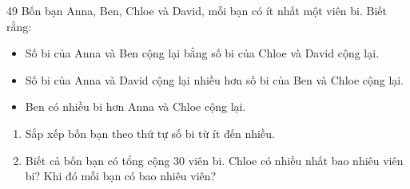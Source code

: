\begin{probbox}{49}{}
Bốn bạn Anna, Ben, Chloe và David, mỗi bạn có ít nhất một viên bi. Biết rằng:
\begin{itemize}[leftmargin=1.6em,itemsep=0pt]
\item[(1)] Số bi của Anna và Ben cộng lại bằng số bi của Chloe và David cộng lại.
\item[(2)] Số bi của Anna và David cộng lại nhiều hơn số bi của Ben và Chloe cộng lại.
\item[(3)] Ben có nhiều bi hơn Anna và Chloe cộng lại.
\end{itemize}
\begin{enumerate}[label=\alph*),leftmargin=1.6em,itemsep=1pt]
\item Sắp xếp bốn bạn theo thứ tự số bi từ ít đến nhiều.
\item Biết cả bốn bạn có tổng cộng $30$ viên bi. Chloe có nhiều nhất bao nhiêu viên bi? Khi đó mỗi bạn có bao nhiêu viên?
\end{enumerate}
\end{probbox}

